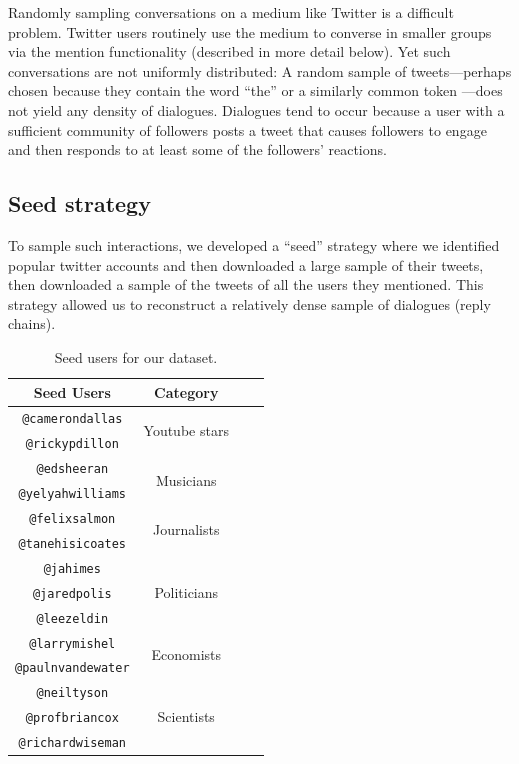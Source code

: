 \documentclass[11pt,letterpaper]{article}
\begin{document}
Randomly sampling conversations on a medium like Twitter is a difficult problem. Twitter users routinely use the medium to converse in smaller groups via the \@ mention functionality (described in more detail below). Yet such conversations are not uniformly distributed: A random sample of tweets---perhaps chosen because they contain the word ``the'' or a similarly common token \cite{doyle2014}---does not yield any density of dialogues. Dialogues tend to occur because a user with a sufficient community of followers posts a tweet that causes followers to engage and then responds to at least some of the followers' reactions. 

\subsection{Seed strategy}

To sample such interactions, we developed a ``seed'' strategy where we identified popular twitter accounts and then downloaded a large sample of their tweets, then downloaded a sample of the tweets of all the users they mentioned. This strategy allowed us to reconstruct a relatively dense sample of dialogues (reply chains).

\begin{table}
\begin{center}
\begin{tabular}{|c|c|c|c|}
\hline
Seed Users & Category \\ %
\hline
{\tt @camerondallas} & \multirow{2}{*}{Youtube stars} \\
{\tt @rickypdillon} & \\
\hline
{\tt @edsheeran} & \multirow{2}{*}{Musicians} \\
{\tt @yelyahwilliams} & \\
\hline
{\tt @felixsalmon} & \multirow{2}{*}{Journalists} \\
{\tt @tanehisicoates} & \\
\hline
{\tt @jahimes} & \multirow{3}{*}{Politicians} \\
{\tt @jaredpolis} & \\
{\tt @leezeldin} & \\
\hline
{\tt @larrymishel} & \multirow{2}{*}{Economists} \\
{\tt @paulnvandewater} & \\
\hline
{\tt @neiltyson} & \multirow{3}{*}{Scientists} \\
{\tt @profbriancox} & \\
{\tt @richardwiseman} & \\
\hline
\end{tabular}
\end{center}
\caption{\label{tab:seed-users} Seed users for our dataset.}
\end{table}
\end{document}
